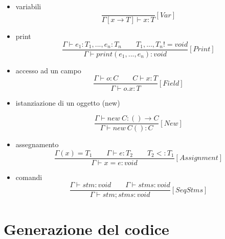 \documentclass[a4paper]{article}   %
\begin{document}
\begin{itemize}
  \item variabili %
  $$ \frac{}{\Gamma [x \rightarrow T] \vdash x : T}[Var] $$

  \item print %
  $$ \frac{\Gamma \vdash e_1 : T_1, ..., e_n : T_n \qquad T_1,...,T_n != void}{\Gamma \vdash print(e_1,...,e_n) : void }[Print]$$
\begin{comment}
  \item chiamata di funzione (con subtyping)

  \item chiamata di metodo (con subtyping)
  $$ \frac{\Gamma(o) = C \qquad \Gamma(c)(m) = T_1, ... , T_n \rightarrow T \qquad (\Gamma \vdash e_i : T_i' \ \ \ T_i' <: T_i)\textsuperscript{i \in 1..n}}{\Gamma \vdash o.m(e_1,...,e_n) : T}[SbtMethodCall] $$
\end{comment}
  \item accesso ad un campo
  $$ \frac{\Gamma \vdash o : C \qquad C \vdash x : T}{\Gamma \vdash o.x : T}[Field] $$

  \item istanziazione di un oggetto (new) %

  $$ \frac{\Gamma \vdash new \ C : () \rightarrow C}{\Gamma \vdash new \ C() : C}[New] $$

  \item assegnamento %
  $$ \frac{\Gamma(x) = T_1 \qquad \Gamma \vdash e : T_2 \qquad T_2 <: T_1}{\Gamma \vdash x = e : void}[Assignment] $$

  \item comandi
  $$ \frac{\Gamma \vdash stm : void \qquad \Gamma \vdash stms : void}{\Gamma \vdash stm ; stms : void}[SeqStms] $$
\end{itemize}
\section{Generazione del codice}
\end{document}
